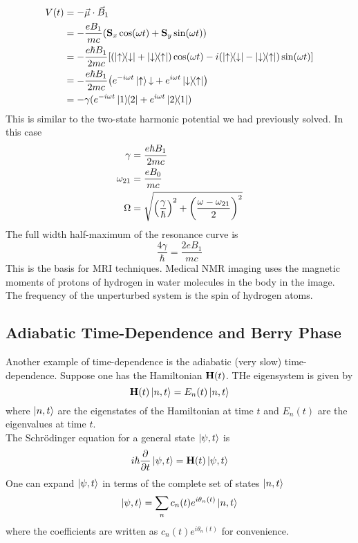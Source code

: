 \documentclass[12pt,a4paper,titlepage]{article}
\newcommand{\up}{\uparrow} %
\newcommand{\dn}{\downarrow} %
\begin{document}
\begin{equation}
\begin{aligned}
V(t)&=-\vec{\mu}\cdot\vec{B}_{1}\\
&=-\frac{eB_{1}}{mc}\qty(\vb{S}_{x}\cos(\omega t)+\vb{S}_{y}\sin(\omega t))\\
&=-\frac{e\hbar B_{1}}{2mc}\qty[\qty(\op{\up}{\dn}+\op{\dn}{\up})\cos(\omega t)-i\qty(\op{\up}{\dn}-\op{\dn}{\up})\sin(\omega t)]\\
&=-\frac{e\hbar B_{1}}{2mc}\qty(e^{-i\omega t}\ket{\up}{\dn}+e^{i\omega t}\op{\dn}{\up})\\
&=-\gamma(e^{-i\omega t}\op{1}{2}+e^{i\omega t}\op{2}{1})
\end{aligned}
\end{equation}
This is similar to the two-state harmonic potential we had previously solved. In this case
\begin{equation}
\begin{aligned}
\gamma&=\frac{e\hbar B_{1}}{2mc}\\
\omega_{21}&=\frac{eB_{0}}{mc}\\
\Omega&=\sqrt{\qty(\frac{\gamma}{\hbar})^{2}+\qty(\frac{\omega-\omega_{21}}{2})^{2}}
\end{aligned}
\end{equation}
The full width half-maximum of the resonance curve is
\begin{equation}
\frac{4\gamma}{\hbar}=\frac{2eB_{1}}{mc}
\end{equation}
This is the basis for MRI techniques. Medical NMR imaging uses the magnetic moments of protons of hydrogen in water molecules in the body in the image. The frequency of the unperturbed system is the spin of hydrogen atoms.

\subsection{Adiabatic Time-Dependence and Berry Phase}
Another example of time-dependence is the adiabatic (very slow) time-dependence. Suppose one has the Hamiltonian $\vb{H}(t)$. THe eigensystem is given by
\begin{equation}
\vb{H}(t)\ket{n,t}=E_{n}(t)\ket{n,t}
\end{equation}
where $\ket{n,t}$ are the eigenstates of the Hamiltonian at time $t$ and $E_{n}(t)$ are the eigenvalues at time $t$.\\

The Schr\"{o}dinger equation for a general state $\ket{\psi,t}$ is
\begin{equation}
i\hbar\pdv{t}\ket{\psi,t}=\vb{H}(t)\ket{\psi,t}
\end{equation}
One can expand $\ket{\psi,t}$ in terms of the complete set of states $\ket{n,t}$
\begin{equation}
\ket{\psi,t}=\sum_{n}c_{n}(t)e^{i\theta_{n}(t)}\ket{n,t}
\end{equation}
where the coefficients are written as $c_{n}(t)e^{i\theta_{n}(t)}$ for convenience.\\
\end{document}
